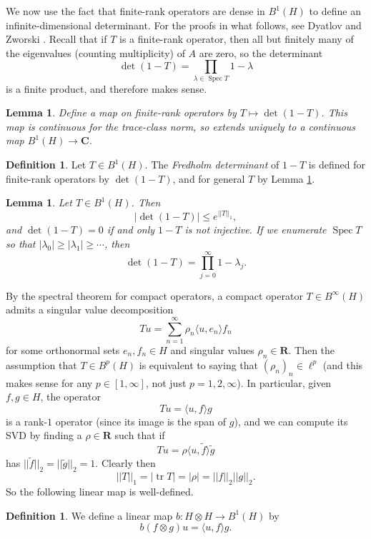 \documentclass[12pt]{report}
\newcommand{\RR}{\mathbf{R}}
\newcommand{\CC}{\mathbf{C}}
\DeclareMathOperator{\Spec}{Spec}
\newcommand{\tr}{\operatorname{tr}}
\newcommand{\dfn}[1]{\emph{#1}\index{#1}}
\newtheorem{lemma}[theorem]{Lemma}
\theoremstyle{definition}
\newtheorem{definition}[theorem]{Definition}
\begin{document}
We now use the fact that finite-rank operators are dense in $B^1(H)$ to define an infinite-dimensional determinant. For the proofs in what follows, see Dyatlov and Zworski \cite[Appendix B]{dyatlov2019mathematical}.
Recall that if $T$ is a finite-rank operator, then all but finitely many of the eigenvalues (counting multiplicity) of $A$ are zero, so the determinant
$$\det(1-T) = \prod_{\lambda \in \Spec T} 1 - \lambda$$
is a finite product, and therefore makes sense.
\begin{lemma}
\label{fredholm determinant is well-defined}
Define a map on finite-rank operators by $T \mapsto \det(1-T)$. This map is continuous for the trace-class norm, so extends uniquely to a continuous map $B^1(H) \to \CC$.
\end{lemma}
\begin{definition}
Let $T \in B^1(H)$. The \dfn{Fredholm determinant} of $1 - T$ is defined for finite-rank operators by $\det(1 - T)$, and for general $T$ by Lemma \ref{fredholm determinant is well-defined}.
\end{definition}
\begin{lemma}
Let $T \in B^1(H)$. Then
$$|\det(1 - T)| \leq e^{||T||_1},$$
and $\det(1 - T) = 0$ if and only $1 - T$ is not injective. If we enumerate $\Spec T$ so that $|\lambda_0| \geq |\lambda_1| \geq \cdots$, then
$$\det(1-T) = \prod_{j=0}^\infty 1 - \lambda_j.$$
\end{lemma}

By the spectral theorem for compact operators, a compact operator $T \in B^\infty(H)$ admits a singular value decomposition
$$Tu = \sum_{n=1}^\infty \rho_n \langle u, e_n\rangle f_n$$
for some orthonormal sets $e_n,f_n \in H$ and singular values $\rho_n \in \RR$. Then the assumption that $T \in B^p(H)$ is equivalent to saying that $(\rho_n)_n \in \ell^p$ (and this makes sense for any $p \in [1, \infty]$, not just $p =1,2,\infty$). In particular, given $f, g \in H$, the operator
$$Tu = \langle u, f \rangle g$$
is a rank-$1$ operator (since its image is the span of $g$), and we can compute its SVD by finding a $\rho \in \RR$ such that if
$$Tu = \rho \langle u, \tilde f \rangle \tilde g$$
has $||\tilde f||_2 = ||\tilde g||_2 = 1$. Clearly then
\begin{equation}\label{b1 norm of a tensor product}||T||_1 = |\tr T| = |\rho| = ||f||_2 ||g||_2.\end{equation}
So the following linear map is well-defined.
\begin{definition}
\label{tensor products are trace class}
We define a linear map $b: H \otimes H \to B^1(H)$ by
$$b(f \otimes g)u = \langle u, f \rangle g.$$
\end{definition}
\end{document}

